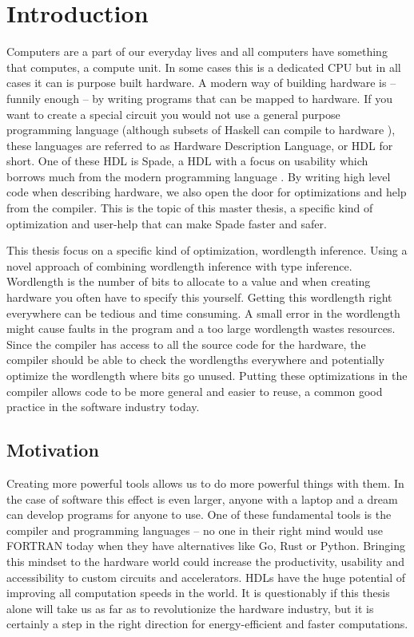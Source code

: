 \documentclass[msc,lith,english]{liuthesis}
\author{Edvard Thörnros}
\begin{document}
\chapter{Introduction}
\label{chaIntro}
Computers are a part of our everyday lives and all computers have something that computes, a compute unit. In some cases this is a dedicated CPU but in all cases it can is purpose built hardware. A modern way of building hardware is -- funnily enough -- by writing programs that can be mapped to hardware. If you want to create a special circuit you would not use a general purpose programming language (although subsets of Haskell can compile to hardware \cite{src:ClashExists}), these languages are referred to as Hardware Description Language, or HDL for short. One of these HDL is Spade, a HDL with a focus on usability which borrows much from the modern programming language \cite{src:spadeSomething} \cite{src:spadeAnHDL}. By writing high level code when describing hardware, we also open the door for optimizations and help from the compiler. This is the topic of this master thesis, a specific kind of optimization and user-help that can make Spade faster and safer.

This thesis focus on a specific kind of optimization, wordlength inference. Using a novel approach of combining wordlength inference with type inference. Wordlength is the number of bits to allocate to a value and when creating hardware you often have to specify this yourself. Getting this wordlength right everywhere can be tedious and time consuming. A small error in the wordlength might cause faults in the program and a too large wordlength wastes resources. %
Since the compiler has access to all the source code for the hardware, the compiler should be able to check the wordlengths everywhere and potentially optimize the wordlength where bits go unused. Putting these optimizations in the compiler allows code to be more general and easier to reuse, a common good practice in the software industry today. 

\section{Motivation}
Creating more powerful tools allows us to do more powerful things with them. In the case of software this effect is even larger, anyone with a laptop and a dream can develop programs for anyone to use. One of these fundamental tools is the compiler and programming languages -- no one in their right mind would use FORTRAN today when they have alternatives like Go, Rust or Python. Bringing this mindset to the hardware world could increase the productivity, usability and accessibility to custom circuits and accelerators. HDLs have the huge potential of improving all computation speeds in the world. It is questionably if this thesis alone will take us as far as to revolutionize the hardware industry, but it is certainly a step in the right direction for energy-efficient and faster computations.
\end{document}
